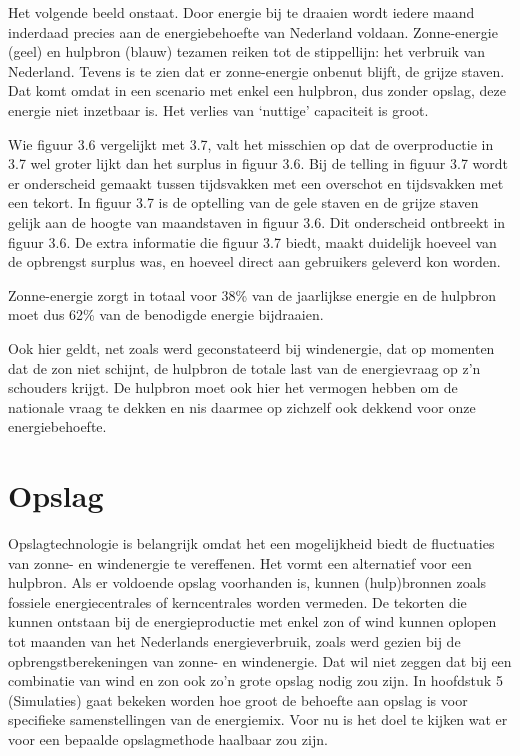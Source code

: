 \documentclass[
  11pt,
  a4paper,
]{book}
\begin{document}
\noindent
Het volgende beeld onstaat. Door energie bij te draaien wordt iedere maand inderdaad precies aan de energiebehoefte van Nederland voldaan. Zonne-energie (geel) en hulpbron (blauw) tezamen reiken tot de stippellijn: het verbruik van Nederland. Tevens is te zien dat er zonne-energie onbenut blijft, de grijze staven. Dat komt omdat in een scenario met enkel een hulpbron, dus zonder opslag, deze energie niet inzetbaar is. Het verlies van `nuttige' capaciteit is groot.

Wie figuur 3.6 vergelijkt met 3.7, valt het misschien op dat de overproductie in 3.7 wel groter lijkt dan het surplus in figuur 3.6. Bij de telling in figuur 3.7 wordt er onderscheid gemaakt tussen tijdsvakken met een overschot en tijdsvakken met een tekort. In figuur 3.7 is de optelling van de gele staven en de grijze staven gelijk aan de hoogte van maandstaven in figuur 3.6. Dit onderscheid ontbreekt in figuur 3.6. De extra informatie die figuur 3.7 biedt, maakt duidelijk hoeveel van de opbrengst surplus was, en hoeveel direct aan gebruikers geleverd kon worden.

Zonne-energie zorgt in totaal voor 38\% van de jaarlijkse energie en de hulpbron moet dus 62\% van de benodigde energie bijdraaien.

Ook hier geldt, net zoals werd geconstateerd bij windenergie, dat op momenten dat de zon niet schijnt, de hulpbron de totale last van de energievraag op z'n schouders krijgt. De hulpbron moet ook hier het vermogen hebben om de nationale vraag te dekken en nis daarmee op zichzelf ook dekkend voor onze energiebehoefte.

\hypertarget{opslag}{%
\chapter{Opslag}\label{opslag}}

Opslagtechnologie is belangrijk omdat het een mogelijkheid biedt de fluctuaties van zonne- en windenergie te vereffenen. Het vormt een alternatief voor een hulpbron. Als er voldoende opslag voorhanden is, kunnen (hulp)bronnen zoals fossiele energiecentrales of kerncentrales worden vermeden.
De tekorten die kunnen ontstaan bij de energieproductie met enkel zon of wind kunnen oplopen tot maanden van het Nederlands energieverbruik, zoals werd gezien bij de opbrengstberekeningen van zonne- en windenergie. Dat wil niet zeggen dat bij een combinatie van wind en zon ook zo'n grote opslag nodig zou zijn. In hoofdstuk 5 (Simulaties) gaat bekeken worden hoe groot de behoefte aan opslag is voor specifieke samenstellingen van de energiemix. Voor nu is het doel te kijken wat er voor een bepaalde opslagmethode haalbaar zou zijn.
\end{document}
